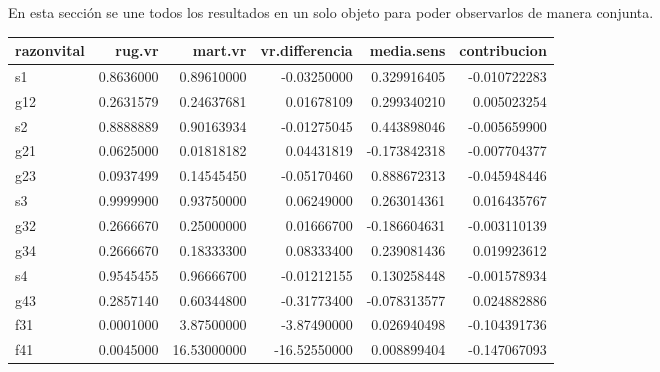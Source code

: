 \documentclass[
  12pt,
  letterpaper,
]{book}
\newenvironment{Shaded}{\begin{snugshade}}{\end{snugshade}}
\newcommand{\AttributeTok}[1]{\textcolor[rgb]{0.40,0.45,0.13}{#1}}
\newcommand{\FunctionTok}[1]{\textcolor[rgb]{0.28,0.35,0.67}{#1}}
\newcommand{\NormalTok}[1]{\textcolor[rgb]{0.00,0.23,0.31}{#1}}
\newcommand{\OtherTok}[1]{\textcolor[rgb]{0.00,0.23,0.31}{#1}}
\newcommand{\SpecialCharTok}[1]{\textcolor[rgb]{0.37,0.37,0.37}{#1}}
\begin{document}
En esta sección se une todos los resultados en un solo objeto para poder
observarlos de manera conjunta.

\begin{Shaded}
\end{Shaded}

\begin{table}
\fontsize{12.0pt}{14.0pt}\selectfont
\begin{tabular*}{\linewidth}{@{\extracolsep{\fill}}lrrrrr}
\toprule
razonvital & rug.vr & mart.vr & vr.differencia & media.sens & contribucion \\ 
\midrule\addlinespace[2.5pt]
s1 & 0.8636000 & 0.89610000 & -0.03250000 & 0.329916405 & -0.010722283 \\ 
g12 & 0.2631579 & 0.24637681 & 0.01678109 & 0.299340210 & 0.005023254 \\ 
s2 & 0.8888889 & 0.90163934 & -0.01275045 & 0.443898046 & -0.005659900 \\ 
g21 & 0.0625000 & 0.01818182 & 0.04431819 & -0.173842318 & -0.007704377 \\ 
g23 & 0.0937499 & 0.14545450 & -0.05170460 & 0.888672313 & -0.045948446 \\ 
s3 & 0.9999900 & 0.93750000 & 0.06249000 & 0.263014361 & 0.016435767 \\ 
g32 & 0.2666670 & 0.25000000 & 0.01666700 & -0.186604631 & -0.003110139 \\ 
g34 & 0.2666670 & 0.18333300 & 0.08333400 & 0.239081436 & 0.019923612 \\ 
s4 & 0.9545455 & 0.96666700 & -0.01212155 & 0.130258448 & -0.001578934 \\ 
g43 & 0.2857140 & 0.60344800 & -0.31773400 & -0.078313577 & 0.024882886 \\ 
f31 & 0.0001000 & 3.87500000 & -3.87490000 & 0.026940498 & -0.104391736 \\ 
f41 & 0.0045000 & 16.53000000 & -16.52550000 & 0.008899404 & -0.147067093 \\ 
\bottomrule
\end{tabular*}
\end{table}
\end{document}
